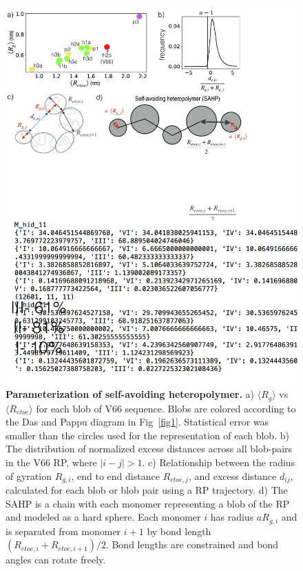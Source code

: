 \documentclass[10pt,letterpaper]{article}
\begin{document}
\begin{figure}[!ht]
\includegraphics[scale=0.5,width=\textwidth,trim={0 0cm 0 0cm},clip]{./figures/fig9.pdf}
\caption{{\bf Parameterization of self-avoiding heteropolymer.} a) $\langle R_g \rangle$ vs $\langle R_{etoe} \rangle$ for each blob of V66 sequence. Blobs are colored according to the Das and Pappu diagram in Fig~\ref{fig1}. Statistical error was smaller than the circles used for the representation of each blob. b) The distribution of normalized excess distances across all blob-pairs in the V66 RP, where $|i-j| > 1$. c) Relationship between the radius of gyration $R_{g,i}$, end to end distance $R_{etoe,j}$, and excess distance $d_{ij}$, calculated for each blob or blob pair using a RP trajectory. d) The SAHP is a chain with each monomer representing a blob of the RP and modeled as a hard sphere. Each monomer $i$ has radius $a R_{g,i}$ and is separated from monomer $i+1$ by bond length $(R_{etoe,i}+R_{etoe,i+1})/2$. Bond lengths are constrained and bond angles can rotate freely.}
\label{fig9} 
\end{figure}
\end{document}
